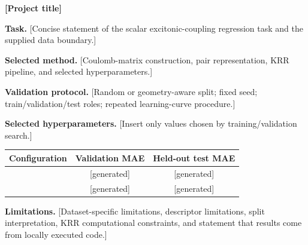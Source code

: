 \documentclass[10pt]{article}
\begin{document}
\begin{center}
{\Large \textbf{[Project title]}}\\
[Author name] \quad [Date]
\end{center}

\textbf{Task.} [Concise statement of the scalar excitonic-coupling regression task and the supplied data boundary.]

\textbf{Selected method.} [Coulomb-matrix construction, pair representation, KRR pipeline, and selected hyperparameters.]

\textbf{Validation protocol.} [Random or geometry-aware split; fixed seed; train/validation/test roles; repeated learning-curve procedure.]

\begin{center}
\end{center}

\textbf{Selected hyperparameters.} [Insert only values chosen by training/validation search.]

\begin{center}
\begin{tabular}{lcc}
\toprule
Configuration & Validation MAE & Held-out test MAE \\
\midrule
[Baseline] & [generated] & [generated] \\
[Selected KRR] & [generated] & [generated] \\
\bottomrule
\end{tabular}
\end{center}

\textbf{Limitations.} [Dataset-specific limitations, descriptor limitations, split interpretation, KRR computational constraints, and statement that results come from locally executed code.]
\end{document}
